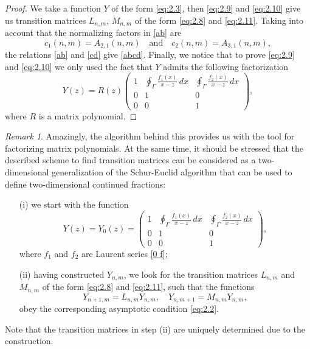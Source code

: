 \documentclass{amsart}
\theoremstyle{remark}
\newtheorem{remark}[theorem]{Remark}
\numberwithin{equation}{section}
\begin{document}
\begin{proof}
We take a function $Y$ of the form \eqref{eq:2.3}, then \eqref{eq:2.9} and \eqref{eq:2.10} give us
transition matrices $L_{n,m},\,M_{n,m}$ of the form  \eqref{eq:2.8} and \eqref{eq:2.11}.
Taking into account that the normalizing factors in \eqref{ab} are
$$ c_1(n,m) = A_{2,1}(n,m)\quad \mbox{and} \quad c_2(n,m) = A_{3,1}(n,m),$$
the relations \eqref{ab} and \eqref{cd} give \eqref{abcd}.
Finally, we notice that to prove \eqref{eq:2.9} and \eqref{eq:2.10} we only used the fact that $Y$
admits the following factorization
\[
Y(z)=R(z)\begin{pmatrix}
                        1 &\oint_{\Gamma} \frac{f_1(x)}{x-z}\,dx& \oint_{\Gamma} \frac{f_2(x)}{x-z}\,dx\\
                        0 &  1  & 0  \\
                        0 & 0 & 1
                        \end{pmatrix},
\]
where $R$ is a matrix polynomial.

\end{proof}

\begin{remark}
Amazingly, the algorithm behind this provides us with the tool for factorizing
matrix polynomials.
At the same time, it should be stressed that the described scheme to find transition matrices can be considered as a two-dimensional generalization of the Schur-Euclid algorithm that can be used to define two-dimen\-sional continued fractions:
\begin{enumerate}
    \item[(i)]
        we start with the function
        \[
       Y(z)=Y_0(z)=\begin{pmatrix}
                        1 &\oint_{\Gamma} \frac{f_1(x)}{x-z}\,dx& \oint_{\Gamma} \frac{f_2(x)}{x-z}\,dx\\
                        0 &  1  & 0  \\
                        0 & 0 & 1
                        \end{pmatrix},
         \]
         where $f_1$ and $f_2$ are Laurent series \eqref{0 f};
    \item[(ii)]
        having constructed $Y_{n,m}$, we look for the transition matrices $L_{n,m}$ and $M_{n,m}$ of the
        form \eqref{eq:2.8} and \eqref{eq:2.11}, such that
        the functions
        \[
        Y_{n+1,m} =L_{n,m}  Y_{n,m},\quad
        Y_{n,m+1} = M_{n,m}  Y_{n,m},
        \]
        obey the corresponding asymptotic condition \eqref{eq:2.2}.
\end{enumerate}
Note that the transition matrices in step (ii) are uniquely determined due to the construction.
\end{remark}
\end{document}
